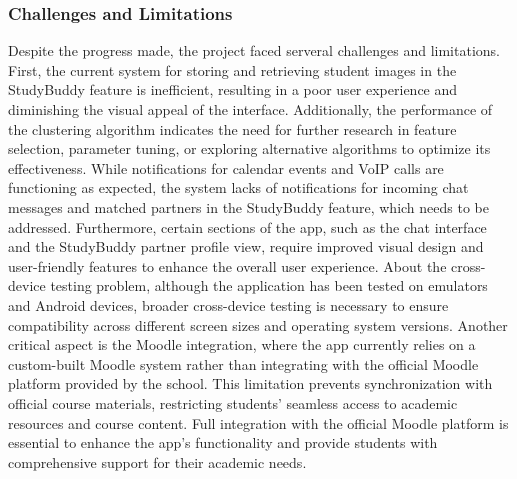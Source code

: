 \documentclass[12pt]{article}
\begin{document}
\subsubsection{Challenges and Limitations}
Despite the progress made, the project faced serveral challenges and limitations. First, the current system for storing and retrieving student images in the StudyBuddy feature is inefficient, resulting in a poor user experience and diminishing the visual appeal of the interface. Additionally, the performance of the clustering algorithm indicates the need for further research in feature selection, parameter tuning, or exploring alternative algorithms to optimize its effectiveness. While notifications for calendar events and VoIP calls are functioning as expected, the system lacks of notifications for incoming chat messages and matched partners in the StudyBuddy feature, which needs to be addressed. Furthermore, certain sections of the app, such as the chat interface and the StudyBuddy partner profile view, require improved visual design and user-friendly features to enhance the overall user experience. About the cross-device testing problem, although the application has been tested on emulators and Android devices, broader cross-device testing is necessary to ensure compatibility across different screen sizes and operating system versions. Another critical aspect is the Moodle integration, where the app currently relies on a custom-built Moodle system rather than integrating with the official Moodle platform provided by the school. This limitation prevents synchronization with official course materials, restricting students' seamless access to academic resources and course content. Full integration with the official Moodle platform is essential to enhance the app’s functionality and provide students with comprehensive support for their academic needs.
\end{document}
